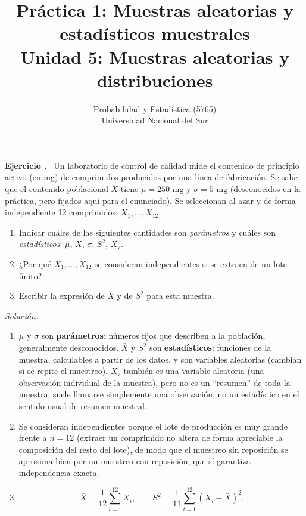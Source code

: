 \documentclass[11pt,a4paper]{article}
\title{Práctica 1: Muestras aleatorias y estadísticos muestrales \\ \large Unidad 5: Muestras aleatorias y distribuciones}
\author{Probabilidad y Estadística (5765) \\ Universidad Nacional del Sur}
\date{}
\newcounter{ejnum}
\newenvironment{ejercicio}{\refstepcounter{ejnum}\par\medskip\noindent\textbf{Ejercicio \theejnum.}~}{\par}
\newenvironment{solucion}{\par\noindent\textit{Solución.}~}{\par\vspace{1em}}
\begin{document}
\maketitle

\begin{ejercicio}
Un laboratorio de control de calidad mide el contenido de principio activo (en mg) de comprimidos producidos por una línea de fabricación. Se sabe que el contenido poblacional $X$ tiene $\mu=250$ mg y $\sigma=5$ mg (desconocidos en la práctica, pero fijados aquí para el enunciado). Se seleccionan al azar y de forma independiente 12 comprimidos: $X_1,\dots,X_{12}$.
\begin{enumerate}[label=(\alph*)]
\item Indicar cuáles de las siguientes cantidades son \emph{parámetros} y cuáles son \emph{estadísticos}: $\mu$, $\bar X$, $\sigma$, $S^2$, $X_7$.
\item ¿Por qué $X_1,\dots,X_{12}$ se consideran independientes si se extraen de un lote finito?
\item Escribir la expresión de $\bar X$ y de $S^2$ para esta muestra.
\end{enumerate}
\end{ejercicio}

\begin{solucion}
\begin{enumerate}[label=(\alph*)]
\item $\mu$ y $\sigma$ son \textbf{parámetros}: números fijos que describen a la población, generalmente desconocidos. $\bar X$ y $S^2$ son \textbf{estadísticos}: funciones de la muestra, calculables a partir de los datos, y son variables aleatorias (cambian si se repite el muestreo). $X_7$ también es una variable aleatoria (una observación individual de la muestra), pero no es un ``resumen'' de toda la muestra; suele llamarse simplemente una observación, no un estadístico en el sentido usual de resumen muestral.
\item Se consideran independientes porque el lote de producción es muy grande frente a $n=12$ (extraer un comprimido no altera de forma apreciable la composición del resto del lote), de modo que el muestreo sin reposición se aproxima bien por un muestreo con reposición, que sí garantiza independencia exacta.
\item
$$\bar X = \frac{1}{12}\sum_{i=1}^{12} X_i, \qquad S^2 = \frac{1}{11}\sum_{i=1}^{12} (X_i-\bar X)^2.$$
\end{enumerate}
\end{solucion}
\end{document}
